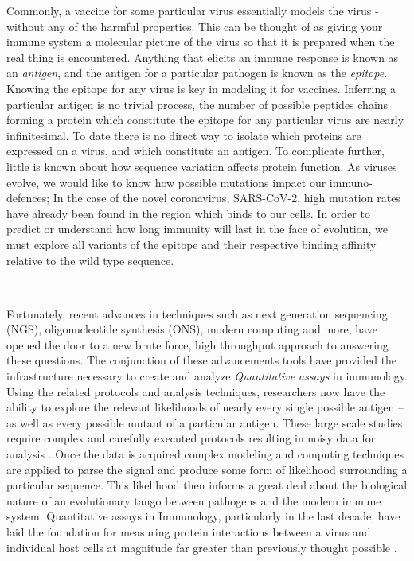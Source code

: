 \documentclass{article}
\begin{document}
Commonly, a vaccine for some particular virus essentially models the virus - without any of the harmful properties.
This can be thought of as giving your immune system a molecular picture of the virus so that it is prepared when the real thing is encountered.
Anything that elicits an immune response is known as an \textit{antigen}, and the antigen for a particular pathogen is known as the \textit{epitope}.
Knowing the epitope for any virus is key in modeling it for vaccines.
Inferring a particular antigen is no trivial process, the number of possible peptides chains forming a protein
which constitute the epitope for any particular virus are nearly infinitesimal.
To date there is no direct way to isolate which proteins are expressed on a virus, and which constitute an antigen.
To complicate further, little is known about how sequence variation affects protein function.
As viruses evolve, we would like to know how possible mutations impact our immuno-defences; 
In the case of the novel coronavirus, SARS-CoV-2, high mutation rates have already been found in the region which binds to our cells.
In order to predict or understand how long immunity will last in the face of evolution, we must explore all variants of the epitope
and their respective binding affinity relative to the wild type sequence.

~

Fortunately, recent advances in techniques such as next generation sequencing (NGS), oligonucleotide synthesis (ONS), modern computing and more, have opened the door to a new brute force, high throughput approach to answering these questions.
The conjunction of these  advancements tools have provided the infrastructure necessary to create and analyze \textit{Quantitative assays} in immunology.
Using the related protocols and analysis techniques, researchers now have the ability to explore the relevant likelihoods of nearly every single possible antigen -- as well as every possible mutant of a particular antigen.
These large scale studies require complex and carefully executed protocols resulting in noisy data for analysis \citep{Mohan2018}.
Once the data is acquired complex modeling and computing techniques are applied to parse the signal and produce some form of likelihood surrounding a particular sequence.
This likelihood then informs a great deal about the biological nature of an evolutionary tango between pathogens and the modern immune system.
Quantitative assays in Immunology, particularly in the last decade, have laid the foundation for measuring protein interactions between a virus and individual host cells at magnitude far greater than previously thought possible \citep{Fowler2014, Bloom2014}.
\end{document}
